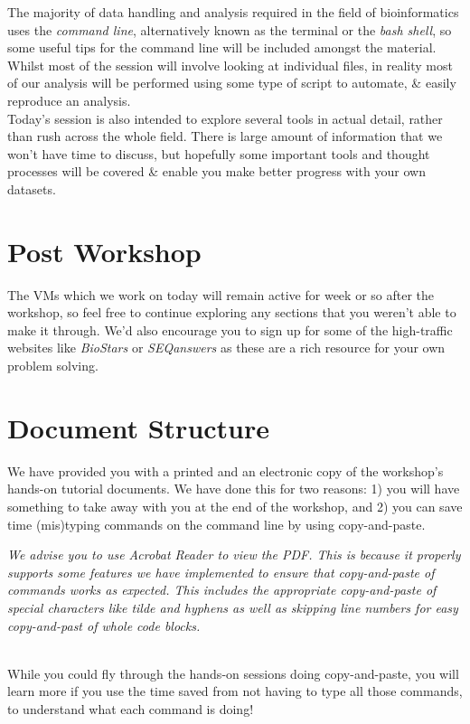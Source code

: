 The majority of data handling and analysis required in the field of bioinformatics uses the \textit{command line}, alternatively known as the terminal or the \textit{bash shell}, so some useful tips for the command line will be included amongst the material.
Whilst most of the session will involve looking at individual files, in reality most of our analysis will be performed using some type of script to automate, \& easily reproduce an analysis. \\

Today's session is also intended to explore several tools in actual detail, rather than rush across the whole field.
There is large amount of information that we won't have time to discuss, but hopefully some important tools and thought processes will be covered \& enable you make better progress with your own datasets.\\

\section{Post Workshop}
The VMs which we work on today will remain active for week or so after the workshop, so feel free to continue exploring any sections that you weren't able to make it through.
We'd also encourage you to sign up for some of the high-traffic websites like \textit{BioStars} or \textit{SEQanswers} as these are a rich resource for your own problem solving.


\section{Document Structure}
We have provided you with a printed and an electronic copy of the workshop's hands-on tutorial documents.
We have done this for two reasons: 1) you will have something to take away with you at the
end of the workshop, and 2) you can save time (mis)typing commands on the command line by using
copy-and-paste.

\emph{We advise you to use Acrobat Reader to view the PDF. This is because it properly supports some
features we have implemented to ensure that copy-and-paste of commands works as expected. This
includes the appropriate copy-and-paste of special characters like tilde and hyphens as well as
skipping line numbers for easy copy-and-past of whole code blocks.}\\
\\

\begin{warning}
While you could fly through the hands-on sessions doing copy-and-paste, you will learn more if you
use the time saved from not having to type all those commands, to understand what each command is
doing!
\end{warning}

